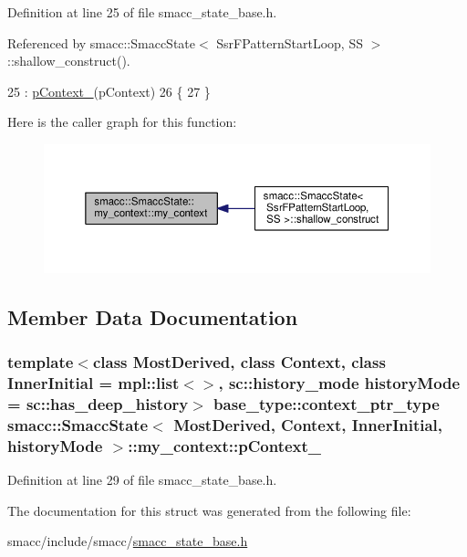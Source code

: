 Definition at line 25 of file smacc\+\_\+state\+\_\+base.\+h.



Referenced by smacc\+::\+Smacc\+State$<$ Ssr\+F\+Pattern\+Start\+Loop, S\+S $>$\+::shallow\+\_\+construct().


\begin{DoxyCode}
25                                                             : \hyperlink{structsmacc_1_1SmaccState_1_1my__context_a85f6eff5aba687932efe3f8117be76d3}{pContext\_}(pContext)
26     \{
27     \}
\end{DoxyCode}


Here is the caller graph for this function\+:
\nopagebreak
\begin{figure}[H]
\begin{center}
\leavevmode
\includegraphics[width=350pt]{structsmacc_1_1SmaccState_1_1my__context_af9c11c27b17bbf7de0d4e21c87d49f6f_icgraph}
\end{center}
\end{figure}




\subsection{Member Data Documentation}
\subsubsection[{\texorpdfstring{p\+Context\+\_\+}{pContext_}}]{\setlength{\rightskip}{0pt plus 5cm}template$<$class Most\+Derived, class Context, class Inner\+Initial = mpl\+::list$<$$>$, sc\+::history\+\_\+mode history\+Mode = sc\+::has\+\_\+deep\+\_\+history$>$ base\+\_\+type\+::context\+\_\+ptr\+\_\+type {\bf smacc\+::\+Smacc\+State}$<$ Most\+Derived, Context, Inner\+Initial, history\+Mode $>$\+::my\+\_\+context\+::p\+Context\+\_\+}\hypertarget{structsmacc_1_1SmaccState_1_1my__context_a85f6eff5aba687932efe3f8117be76d3}{}\label{structsmacc_1_1SmaccState_1_1my__context_a85f6eff5aba687932efe3f8117be76d3}


Definition at line 29 of file smacc\+\_\+state\+\_\+base.\+h.



The documentation for this struct was generated from the following file\+:\begin{DoxyCompactItemize}
\item 
smacc/include/smacc/\hyperlink{smacc__state__base_8h}{smacc\+\_\+state\+\_\+base.\+h}\end{DoxyCompactItemize}

